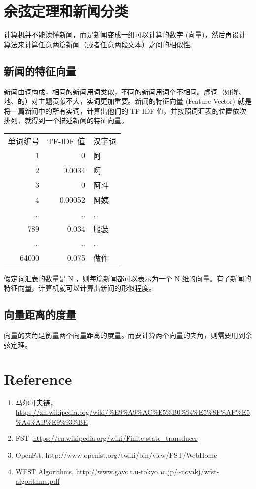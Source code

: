 \documentclass[11pt]{article}
\begin{document}
\section{余弦定理和新闻分类}
\label{sec:orge61a16d}
计算机并不能读懂新闻，而是新闻变成一组可以计算的数字 (向量)，然后再设计算法来计算任意两篇新闻（或者任意两段文本）之间的相似性。

\subsection{新闻的特征向量}
\label{sec:org779bcf1}
新闻由词构成，相同的新闻用词类似，不同的新闻用词个不相同。虚词（如得、地、的）对主题贡献不大，实词更加重要。新闻的特征向量 (Feature Vector) 就是将一篇新闻中的所有实词，计算出他们的 TF-IDF 值，并按照词汇表的位置依次排列，就得到一个描述新闻的特征向量。

\begin{center}
\begin{tabular}{rrl}
单词编号 & TF-IDF 值 & 汉字词\\
1 & 0 & 阿\\
2 & 0.0034 & 啊\\
3 & 0 & 阿斗\\
4 & 0.00052 & 阿姨\\
\ldots{} & \ldots{} & \ldots{}\\
789 & 0.034 & 服装\\
\ldots{} & \ldots{} & \ldots{}\\
64000 & 0.075 & 做作\\
\end{tabular}
\end{center}

假定词汇表的数量是 N ，则每篇新闻都可以表示为一个 N 维的向量。有了新闻的特征向量，计算机就可以计算出新闻的形似程度。

\subsection{向量距离的度量}
\label{sec:org7a4b1de}
向量的夹角是衡量两个向量距离的度量。而要计算两个向量的夹角，则需要用到余弦定理。

\section{Reference}
\label{sec:org2b8fa1f}
\begin{enumerate}
\item 马尔可夫链，\url{https://zh.wikipedia.org/wiki/\%E9\%A9\%AC\%E5\%B0\%94\%E5\%8F\%AF\%E5\%A4\%AB\%E9\%93\%BE}
\item FST ,\url{https://en.wikipedia.org/wiki/Finite-state\_transducer}
\item OpenFst, \url{http://www.openfst.org/twiki/bin/view/FST/WebHome}
\item WFST Algorithms, \url{http://www.gavo.t.u-tokyo.ac.jp/\~novakj/wfst-algorithms.pdf}
\end{enumerate}
\end{document}
